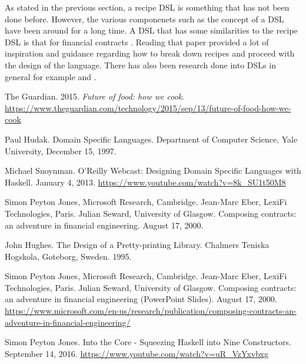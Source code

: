 \documentclass[11pt]{article}
\begin{document}
    As stated in the previous section, a recipe DSL is something that has not been done before.
    However, the various componenets such as the concept of a DSL have been around for a long time.
    A DSL that has some similarities to the recipe DSL is that for financial contracts \cite{contracts}.
    Reading that paper provided a lot of inspiration and guidance regarding how to break down recipes
    and proceed with the design of the language. There has also been research done into DSLs
    in general for example \cite{hudak} and \cite{snoyman}.

    \newpage
    \begin{thebibliography}{5}

        The Guardian. 2015. \textit{Future of food: how we cook}.
        \url{https://www.theguardian.com/technology/2015/sep/13/future-of-food-how-we-cook}

        Paul Hudak. Domain Specific Languages. Department of Computer
        Science, Yale University, December 15, 1997.

        Michael Snoynman. O'Reilly Webcast: Designing Domain Specific
        Languages with Haskell. January 4, 2013.
        \url{https://www.youtube.com/watch?v=8k_SU1t50M8}

        Simon Peyton Jones, Microsoft Research, Cambridge.
        Jean-Marc Eber, LexiFi Technologies, Paris. Julian Seward,
        University of Glasgow. Composing contracts: an adventure in
        financial engineering. August 17, 2000.

        John Hughes. The Design of a Pretty-printing Library.
        Chalmers Teniska Hogskola, Goteborg, Sweden. 1995.

        Simon Peyton Jones, Microsoft Research, Cambridge.
        Jean-Marc Eber, LexiFi Technologies, Paris. Julian Seward,
        University of Glasgow. Composing contracts: an adventure in
        financial engineering (PowerPoint Slides). August 17, 2000.
        \url{https://www.microsoft.com/en-us/research/publication/composing-contracts-an-adventure-in-financial-engineering/}

        Simon Peyton Jones. Into the Core - Squeezing Haskell into
        Nine Constructors. September 14, 2016.
        \url{https://www.youtube.com/watch?v=uR_VzYxvbxg}

    \end{thebibliography}   
     
\end{document}
